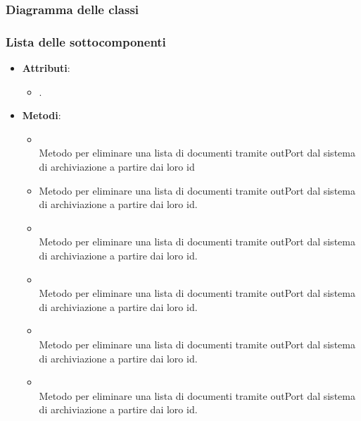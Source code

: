 \documentclass[10pt, a4paper]{article}
\begin{document}
\subsubsection{Diagramma delle classi}
\subsubsection{Lista delle sottocomponenti}


\label{ConfigurationManagerDettaglio}
\begin{itemize}
    \item \textbf{Attributi}:
    \begin{itemize}
        \item {}. 
    \end{itemize}
    \item \textbf{Metodi}:
    \begin{itemize}
        \item {}\\ 
        Metodo per eliminare una lista di documenti tramite outPort dal sistema di archiviazione a partire dai loro id

        \item {}
        Metodo per eliminare una lista di documenti tramite outPort dal sistema di archiviazione a partire dai loro id.

        \item {}\\        
        Metodo per eliminare una lista di documenti tramite outPort dal sistema di archiviazione a partire dai loro id.

        \item {}\\ 
        Metodo per eliminare una lista di documenti tramite outPort dal sistema di archiviazione a partire dai loro id.

        \item {}\\ 
        Metodo per eliminare una lista di documenti tramite outPort dal sistema di archiviazione a partire dai loro id.

        \item {}\\ 
        Metodo per eliminare una lista di documenti tramite outPort dal sistema di archiviazione a partire dai loro id.


\end{itemize}
\end{itemize}
\end{document}
